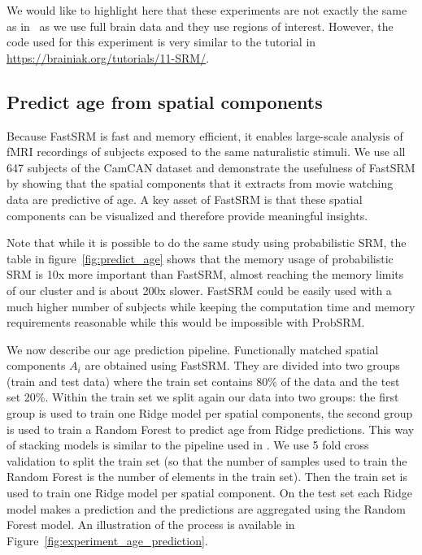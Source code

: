 We would like to highlight here that these experiments are not exactly the same
as in~\cite{chen2015reduced} as we use full brain data and they use regions of
interest. However, the code used for this experiment is very similar to the tutorial in \url{https://brainiak.org/tutorials/11-SRM/}.

\subsection{Predict age from spatial components}
Because FastSRM is fast and memory efficient, it enables large-scale analysis of fMRI recordings of subjects exposed to the same naturalistic stimuli.
% 
We use all 647 subjects of the CamCAN dataset and demonstrate the usefulness of FastSRM by showing that the spatial components that it extracts from movie watching data are predictive of age.
% 
A key asset of FastSRM is that these spatial components can be visualized and therefore provide meaningful insights. 

Note that while it is possible to do the same study using probabilistic SRM, the
table in figure~\ref{fig:predict_age} shows that the memory usage of
probabilistic SRM is 10x more important than FastSRM, almost reaching the memory
limits of our cluster and is about 200x slower. FastSRM could be
easily used with a much higher number of subjects while keeping the computation
time and memory requirements reasonable while this would be impossible with ProbSRM.

We now describe our age prediction pipeline.
Functionally matched spatial components $A_i$ are obtained using FastSRM.
%
They are divided into two groups (train and test data) where the train set contains 80\% of the data and the test set 20\%.
%
Within the train set we split again our data into two groups: the first group is used to train one Ridge model per spatial components, the second group is used to train a Random Forest to predict age from Ridge predictions. This way of stacking models is similar to the pipeline used in \cite{rahim2017joint}.
%
We use 5 fold cross validation to split the train set (so that the number of samples used to train the Random Forest is the number of elements in the train set).
%
Then the train set is used to train one Ridge model per spatial component.
%
On the test set each Ridge model makes a prediction and the predictions are aggregated using the Random Forest model.
%
An illustration of the process is available in Figure~\ref{fig:experiment_age_prediction}. 

